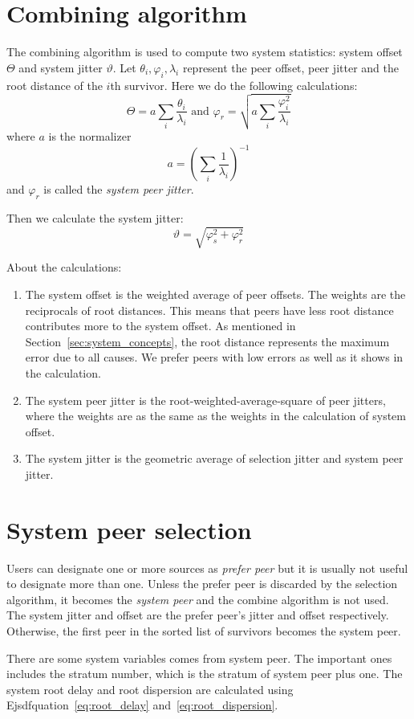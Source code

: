 \section{Combining algorithm}%
\label{sec:combine_algorithm}
The combining algorithm is used to compute two system statistics: system offset 
$\Theta$ and system jitter $\vartheta$. Let $\theta_i, \varphi_i, \lambda_i$
represent the peer offset, peer jitter and the root distance of the $i$th
survivor. Here we do the following calculations:~\cite{redbook}
\begin{equation}
    \Theta = a \sum^{}_{i} \frac{\theta_i}{\lambda_i} \text{ and } 
    \varphi_r = \sqrt{a \sum^{}_{i} \frac{\varphi_i ^ 2}{\lambda_i}}
    \label{eq:system_offset_selection_jitter}
\end{equation}
where $a$ is the normalizer
\begin{equation}
    a = \left( \sum^{}_{i} \frac{1}{\lambda_i} \right) ^ {-1}
    \label{eq:normalizer}
\end{equation}
and $\varphi_r$ is called the \emph{system peer jitter}.~\cite{rfc5905}

Then we calculate the system jitter:~\cite{redbook}
\begin{equation}
    \vartheta = \sqrt{\varphi_s^2 + \varphi_r^2}
    \label{eq:system_jitter}
\end{equation}

About the calculations:
\begin{enumerate}
    \item The system offset is the weighted average of peer offsets. The
        weights are the reciprocals of root distances. This means that peers
        have less root distance contributes more to the system offset. As
        mentioned in Section~\ref{sec:system_concepts}, the root distance
        represents the maximum error due to all causes. We prefer peers with
        low errors as well as it shows in the calculation.
    \item The system peer jitter is the root-weighted-average-square of peer
        jitters, where the weights are as the same as the weights in the
        calculation of system offset.
    \item The system jitter is the geometric average of selection jitter and
        system peer jitter.
\end{enumerate}

\section{System peer selection}%
\label{sec:system_peer_selection}
Users can designate one or more sources as \emph{prefer peer} but it is
usually not useful to designate more than one. Unless the prefer peer is
discarded by the selection algorithm, it becomes the \emph{system peer} and
the combine algorithm is not used. The system jitter and offset are the
prefer peer's jitter and offset respectively. Otherwise, the first peer in
the sorted list of survivors becomes the system peer. 

There are some system variables comes from system peer. The important ones
includes the stratum number, which is the stratum of system peer plus one.
The system root delay and root dispersion are calculated using
Ejsdfquation~\ref{eq:root_delay} and~\ref{eq:root_dispersion}.

